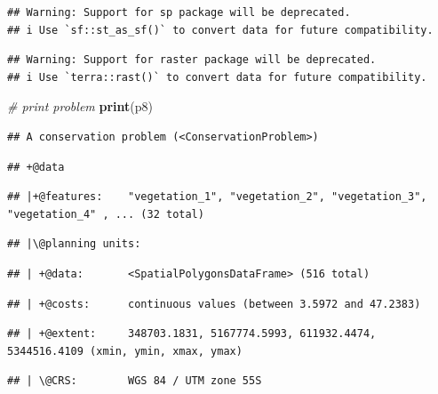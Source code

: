 \documentclass[12pt,]{book}
\newenvironment{Shaded}{\begin{snugshade}}{\end{snugshade}}
\newcommand{\CommentTok}[1]{\textcolor[rgb]{0.56,0.35,0.01}{\textit{#1}}}
\newcommand{\KeywordTok}[1]{\textcolor[rgb]{0.13,0.29,0.53}{\textbf{#1}}}
\newcommand{\NormalTok}[1]{#1}
\begin{document}
\begin{verbatim}
## Warning: Support for sp package will be deprecated.
## i Use `sf::st_as_sf()` to convert data for future compatibility.
\end{verbatim}

\begin{verbatim}
## Warning: Support for raster package will be deprecated.
## i Use `terra::rast()` to convert data for future compatibility.
\end{verbatim}

\clearpage

\begin{Shaded}
\begin{Highlighting}[]
\CommentTok{# print problem}
\KeywordTok{print}\NormalTok{(p8)}
\end{Highlighting}
\end{Shaded}

\begin{verbatim}
## A conservation problem (<ConservationProblem>)
\end{verbatim}

\begin{verbatim}
## +@data
\end{verbatim}

\begin{verbatim}
## |+@features:    "vegetation_1", "vegetation_2", "vegetation_3", "vegetation_4" , ... (32 total)
\end{verbatim}

\begin{verbatim}
## |\@planning units:
\end{verbatim}

\begin{verbatim}
## | +@data:       <SpatialPolygonsDataFrame> (516 total)
\end{verbatim}

\begin{verbatim}
## | +@costs:      continuous values (between 3.5972 and 47.2383)
\end{verbatim}

\begin{verbatim}
## | +@extent:     348703.1831, 5167774.5993, 611932.4474, 5344516.4109 (xmin, ymin, xmax, ymax)
\end{verbatim}

\begin{verbatim}
## | \@CRS:        WGS 84 / UTM zone 55S
\end{verbatim}
\end{document}
